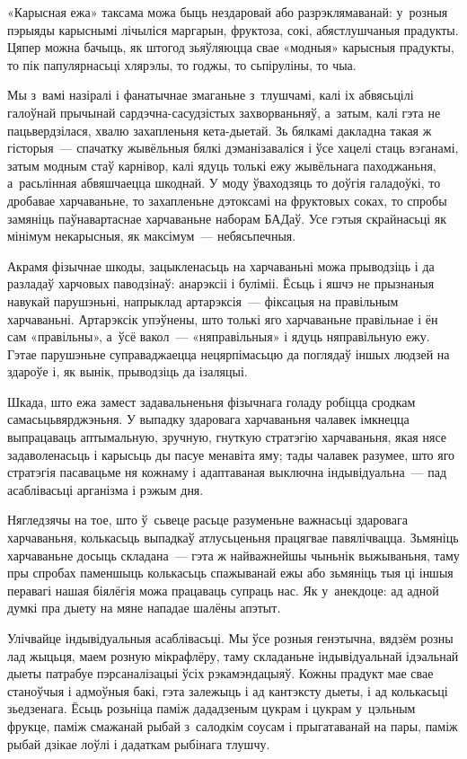 «Карысная ежа» таксама можа быць нездаровай або разрэклямаванай: у~розныя пэрыяды карыснымі лічыліся маргарын, фруктоза, сокі, абястлушчаныя прадукты. Цяпер можна бачыць, як штогод зьяўляюцца свае «модныя» карысныя прадукты, то пік папулярнасьці хлярэлы, то годжы, то сьпіруліны, то чыа.

Мы з~вамі назіралі і фанатычнае змаганьне з~тлушчамі, калі іх абвясьцілі галоўнай прычынай сардэчна-сасудзістых захворваньняў, а~затым, калі гэта не пацьвердзілася, хвалю захапленьня кета-дыетай. Зь бялкамі дакладна такая ж гісторыя~--- спачатку жывёльныя бялкі дэманізаваліся і ўсе хацелі стаць вэганамі, затым модным стаў карнівор, калі ядуць толькі ежу жывёльнага паходжаньня, а~расьлінная абвяшчаецца шкоднай. У моду ўваходзяць то доўгія галадоўкі, то дробавае харчаваньне, то захапленьне дэтоксамі на фруктовых соках, то спробы замяніць паўнавартаснае харчаваньне наборам БАДаў. Усе гэтыя скрайнасьці як мінімум некарысныя, як максімум~--- небясьпечныя.

Акрамя фізычнае шкоды, зацыкленасьць на харчаваньні можа прыводзіць і да разладаў харчовых паводзінаў: анарэксіі і буліміі. Ёсьць і яшчэ не прызнаныя навукай парушэньні, напрыклад артарэксія~--- фіксацыя на правільным харчаваньні. Артарэксік упэўнены, што толькі яго харчаваньне правільнае і ён сам «правільны», а~ўсё вакол~--- «няправільныя» і ядуць няправільную ежу. Гэтае парушэньне суправаджаецца нецярпімасьцю да поглядаў іншых людзей на здароўе і, як вынік, прыводзіць да ізаляцыі.

Шкада, што ежа замест задавальненьня фізычнага голаду робіцца сродкам самасьцьвярджэньня. У выпадку здаровага харчаваньня чалавек імкнецца выпрацаваць аптымальную, зручную, гнуткую стратэгію харчаваньня, якая нясе задаволенасьць і карысьць ды пасуе менавіта яму; тады чалавек разумее, што яго стратэгія пасавацьме ня кожнаму і адаптаваная выключна індывідуальна~--- пад асаблівасьці арганізма і рэжым дня.

Нягледзячы на тое, што ў~сьвеце расьце разуменьне важнасьці здаровага харчаваньня, колькасьць выпадкаў атлусьценьня працягвае павялічвацца. Зьмяніць харчаваньне досыць складана~--- гэта ж найважнейшы чыньнік выжываньня, таму пры спробах паменшыць колькасьць спажыванай ежы або зьмяніць тыя ці іншыя перавагі нашая біялёгія можа працаваць супраць нас. Як у~анекдоце: ад адной думкі пра дыету на мяне нападае шалёны апэтыт.

Улічвайце індывідуальныя асаблівасьці. Мы ўсе розныя генэтычна, вядзём розны лад жыцьця, маем розную мікрафлёру, таму складаньне індывідуальнай ідэальнай дыеты патрабуе пэрсаналізацыі ўсіх рэкамэндацыяў. Кожны прадукт мае свае станоўчыя і адмоўныя бакі, гэта залежыць і ад кантэксту дыеты, і ад колькасьці зьедзенага. Ёсьць розьніца паміж дададзеным цукрам і цукрам у~цэльным фрукце, паміж смажанай рыбай з~салодкім соусам і прыгатаванай на пары, паміж рыбай дзікае лоўлі і дадаткам рыбінага тлушчу.


